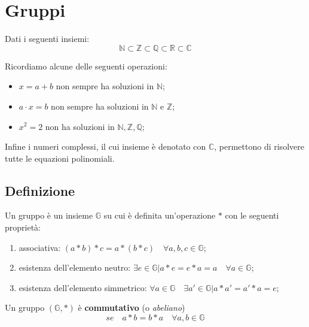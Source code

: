 \chapter{Gruppi}

Dati i seguenti insiemi:
$$ \mathbb{N} \subset \mathbb{Z} \subset \mathbb{Q} \subset \mathbb{R} \subset \mathbb{C} $$

Ricordiamo alcune delle seguenti operazioni:
\begin{itemize}
	\item $ x = a + b $ non sempre ha soluzioni in $ \mathbb{N} $;
	\item $a \cdot x = b $ non sempre ha soluzioni in $ \mathbb{N} $ e $ \mathbb{Z} $;
	\item $ x^2 = 2 $ non ha soluzioni in $ \mathbb{N}, \mathbb{Z}, \mathbb{Q} $;
\end{itemize}

Infine i numeri complessi, il cui insieme è denotato con $ \mathbb{C} $, permettono di risolvere tutte le equazioni polinomiali.


\section{Definizione}
	Un gruppo è un insieme  $ \mathbb{G} $ su cui è definita un'operazione $ * $ con le seguenti proprietà:
	\begin{enumerate}
		\item associativa: $ ( a * b ) * c = a * ( b * c) \quad \forall a, b, c \in \mathbb{G} $;
		\item esistenza dell'elemento neutro: $ \exists e \in \mathbb{G} | a * e = e * a = a \quad \forall a \in \mathbb{G} $;
		\item esistenza dell'elemento simmetrico: $ \forall a \in \mathbb{G} \quad \exists a' \in \mathbb{G} | a * a' = a' * a = e $;
	\end{enumerate}
	
	Un gruppo $ (\mathbb{G}, *) $ è \textbf{commutativo} (o \textit{abeliano})
	$$ se \quad a * b = b * a \quad \forall a, b \in \mathbb{G} $$
	
